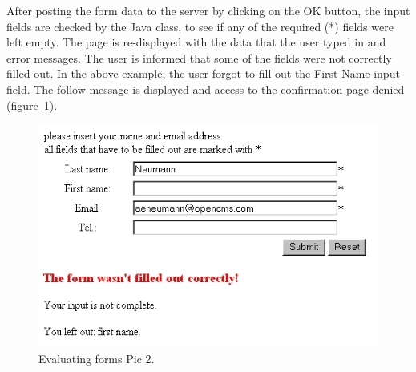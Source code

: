 After posting the form data to the server by clicking on the OK button,
the input fields are checked by the Java class, to see if any of the
required (*) fields were left empty. The page is re-displayed with the
data that the user typed in and error messages. The user is informed
that  some of the fields were not correctly filled out. In the above
example, the user forgot to fill out the First Name input field. The
follow message is displayed and access to the confirmation page denied
(figure~\ref{EvaluForms1}).

\begin{figure}
\begin{center}
\includegraphics[clip,width=0.7\linewidth]{pics/modules/42}
\end{center}
\caption[Evaluating forms Pic 2]{Evaluating forms Pic 2.}
\label{EvaluForms1}
\end{figure}

